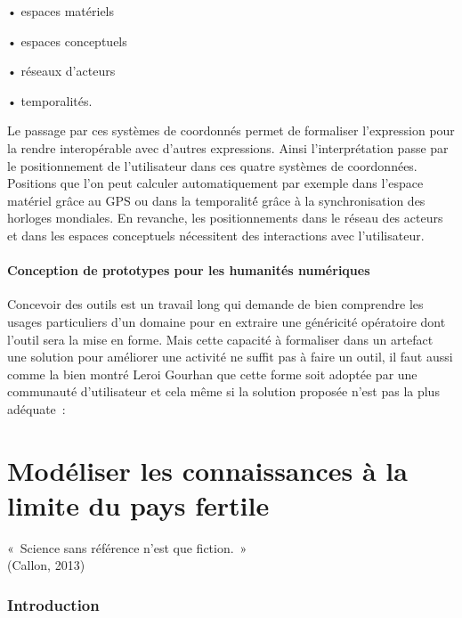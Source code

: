 \documentclass[
  a4paper,
  DIV=11,
  numbers=noendperiod]{scrreprt}
\begin{document}
• espaces matériels

• espaces conceptuels

• réseaux d'acteurs

• temporalités.

Le passage par ces systèmes de coordonnés permet de formaliser
l'expression pour la rendre interopérable avec d'autres expressions.
Ainsi l'interprétation passe par le positionnement de l'utilisateur dans
ces quatre systèmes de coordonnées. Positions que l'on peut calculer
automatiquement par exemple dans l'espace matériel grâce au GPS ou dans
la temporalité́ grâce à la synchronisation des horloges mondiales. En
revanche, les positionnements dans le réseau des acteurs et dans les
espaces conceptuels nécessitent des interactions avec l'utilisateur.

\subsection{Conception de prototypes pour les humanités
numériques}\label{sec-protosHN}

Concevoir des outils est un travail long qui demande de bien comprendre
les usages particuliers d'un domaine pour en extraire une généricité
opératoire dont l'outil sera la mise en forme. Mais cette capacité à
formaliser dans un artefact une solution pour améliorer une activité ne
suffit pas à faire un outil, il faut aussi comme la bien montré Leroi
Gourhan que cette forme soit adoptée par une communauté d'utilisateur et
cela même si la solution proposée n'est pas la plus adéquate~:

\part{Modéliser les connaissances à la limite du pays fertile}

\label{exergue1}
«~Science sans référence n'est que fiction.~»\\
(Callon, 2013)

\section*{Introduction}\label{introduction}

\end{document}
